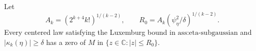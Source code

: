 Let
\[
 A_k=(2^{k+4}k!)^{1/(k-2)},
 \qquad
 R_0=A_k(\psi_{\eta}^2/\delta)^{1/(k-2)}.
\]
Every centered law satisfying the Luxemburg bound in \(\text{ass:eta-subgaussian}\) and \(\lvert\kappa_k(\eta)\rvert\ge\delta\) has a zero of \(M\) in \(\{z\in\mathbb C:\lvert z\rvert\le R_0\}\).